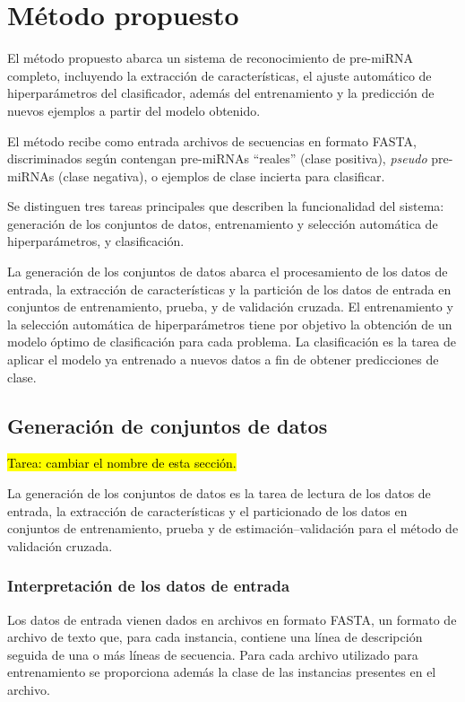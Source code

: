 \documentclass[12pt,bibliography=oldstyle,DIV=12,parskip=half-]{scrreprt}
\newcommand{\e}{\emph}
\begin{document}
\chapter{Método propuesto}
%
El método propuesto abarca un sistema de reconocimiento de pre-miRNA
completo, incluyendo la extracción de características, el ajuste
automático de hiperparámetros del clasificador, además del
entrenamiento y la predicción de nuevos ejemplos a partir del modelo
obtenido.

El método recibe como entrada archivos de secuencias en formato FASTA,
discriminados según contengan pre-miRNAs ``reales'' (clase positiva),
\e{pseudo} pre-miRNAs (clase negativa), o ejemplos de clase incierta
para clasificar.

Se distinguen tres tareas principales que describen la funcionalidad
del sistema: generación de los conjuntos de datos, entrenamiento y
selección automática de hiperparámetros, y clasificación.

La generación de los conjuntos de datos abarca el procesamiento de los
datos de entrada, la extracción de características y la partición de
los datos de entrada en conjuntos de entrenamiento, prueba, y de
validación cruzada.  El entrenamiento y la selección automática de
hiperparámetros tiene por objetivo la obtención de un modelo óptimo de
clasificación para cada problema.  La clasificación es la tarea de
aplicar el modelo ya entrenado a nuevos datos a fin de obtener
predicciones de clase.
%
%
%
\section{Generación de conjuntos de datos}
%
\hl{Tarea: cambiar el nombre de esta sección.}

La generación de los conjuntos de datos es la tarea de lectura de los
datos de entrada, la extracción de características y el particionado
de los datos en conjuntos de entrenamiento, prueba y de
estimación--validación para el método de validación cruzada.
%
%
%
\subsection{Interpretación de los datos de entrada}
%
Los datos de entrada vienen dados en archivos en formato FASTA, un
formato de archivo de texto que, para cada instancia, contiene una
línea de descripción seguida de una o más líneas de secuencia.  Para
cada archivo utilizado para entrenamiento se proporciona además la
clase de las instancias presentes en el archivo.
\end{document}

